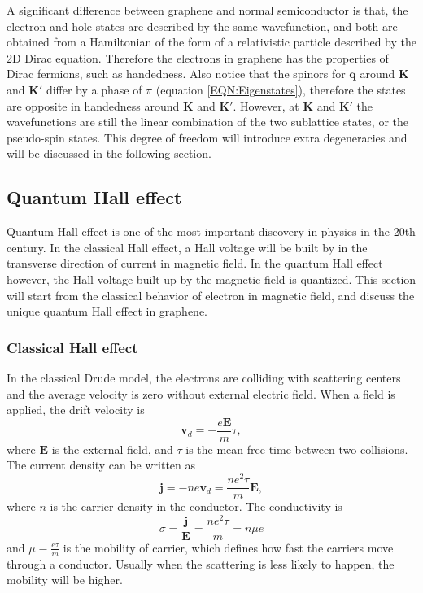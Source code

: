 \documentclass[pdflatex, sectionletters, 12pt]{pittetd}    %
\begin{document}
A significant difference between graphene and normal semiconductor is that, the electron and hole states are described by the same wavefunction, and both are obtained from a Hamiltonian of the form of a relativistic particle described by the 2D Dirac equation\cite{neto2009electronic}. Therefore the electrons in graphene has the properties of Dirac fermions, such as handedness. Also notice that the spinors for $\mathbf{q}$ around $\mathbf{K}$ and $\mathbf{K'}$ differ by a phase of $\pi$ (equation \ref{EQN:Eigenstates}), therefore the states are opposite in handedness around $\mathbf{K}$ and $\mathbf{K'}$. However, at $\mathbf{K}$ and $\mathbf{K'}$ the wavefunctions are still the linear combination of the two sublattice states, or the pseudo-spin states. This degree of freedom will introduce extra degeneracies and will be discussed in the following section.

\subsection{Quantum Hall effect}

Quantum Hall effect is one of the most important discovery in physics in the 20th century. In the classical Hall effect, a Hall voltage will be built by in the transverse direction of current in magnetic field. In the quantum Hall effect however, the Hall voltage built up by the magnetic field is quantized. This section will start from the classical behavior of electron in magnetic field, and discuss the unique quantum Hall effect in graphene.

\subsubsection{Classical Hall effect}

In the classical Drude model, the electrons are colliding with scattering centers and the average velocity is zero without external electric field. When a field is applied, the drift velocity is 
\begin{equation}
\mathbf{v}_d = -\frac{e\mathbf{E}}{m}\tau,
\label{EQN:ClassicalE}
\end{equation}
where $\mathbf{E}$ is the external field, and $\tau$ is the mean free time between two collisions. The current density can be written as 
$$\mathbf{j} = -ne\mathbf{v}_d = \frac{ne^2\tau}{m}\mathbf{E},$$
where $n$ is the carrier density in the conductor. The conductivity is 
\begin{equation}
\sigma = \frac{\mathbf{j}}{\mathbf{E}} = \frac{ne^2\tau}{m} = n\mu e
\label{EQN:Conductivity}
\end{equation}
and $\displaystyle \mu \equiv \frac{e\tau}{m}$ is the mobility of carrier, which defines how fast the carriers move through a conductor. Usually when the scattering is less likely to happen, the mobility will be higher.
\end{document}
